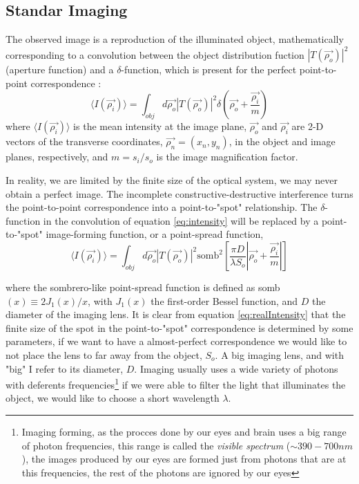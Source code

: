 \subsection{Standar Imaging}

The observed image is a reproduction of the illuminated object, mathematically
corresponding to a convolution between the object distribution fuction $ |T(\vec{\rho_o})|^2$ (aperture function) 
and a $\delta$-function, which is present for the perfect
point-to-point correspondence \cite{introquantumoptics}:
\begin{equation}
\label{eq:intensity}
\langle I(\vec{\rho_i}) \rangle =\int_{obj} d\vec{\rho_o} |T(\vec{\rho_o})|^2 \delta(\vec{\rho_o}+\frac{\vec{\rho_i}}{m})
\end{equation}
where $\langle I(\vec{\rho_i})\rangle $ is the mean intensity at the image plane, $\vec{\rho_o}$ and $\vec{\rho_i}$ are 2-D vectors of the
transverse coordinates, $\vec{\rho_n}= (x_n,y_n)$, in the object and image planes, respectively, and
$m=s_i/s_o$ is the image magnification factor.

In reality, we are limited by the finite size of the optical system, we may never obtain a perfect image.
The incomplete constructive-destructive interference turns the point-to-point correspondence into 
 a point-to-"spot" relationship. The $\delta$-function in the convolution of equation \ref{eq:intensity}
will be replaced by a point-to-"spot" image-forming function, or a point-spread function,
\begin{equation}
\label{eq:realIntensity}
\langle I(\vec{\rho_i}) \rangle =\int_{obj} d\vec{\rho_o} |T(\vec{\rho_o})|^2 \text{somb}^2[\frac{\pi D}{\lambda S_o} | \vec{\rho_o}+\frac{\vec{\rho_i}}{m}|]
\end{equation}

where the sombrero-like point-spread function is defined as 
somb$(x) \equiv  2J_1(x)/x$, with $J_1(x)$ the first-order Bessel function, and $D$ the diameter of the imaging lens.
It is clear from equation \ref{eq:realIntensity} that the finite size of the spot in the point-to-"spot" 
correspondence is determined by some parameters, if we want to have a almost-perfect correspondence we 
would like to not place the lens to far away from the object, $S_o$. A big imaging lens, and with "big" I refer to its diameter, $D$.
Imaging usually uses a wide variety of photons with deferents 
frequencies\footnote{Imaging forming, as the procces done by our eyes and brain uses a big range of
photon frequencies, this range is called the \textit{visible spectrum} ($\sim 390-700 nm$), the images produced by our eyes are formed just from photons 
that are at this frequencies, the rest of the photons are ignored by our eyes} 
if we were able to filter the light that illuminates the object, we would like to choose a short
wavelength $\lambda$. 

